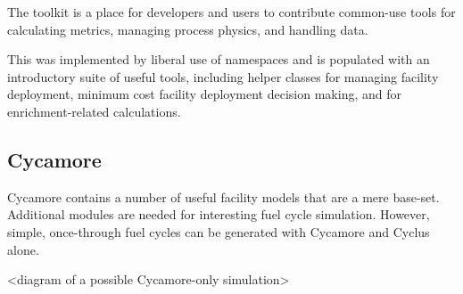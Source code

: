 The toolkit is a place for developers and users to contribute common-use tools 
for calculating metrics, managing process physics, and handling data.

This was implemented by liberal use of namespaces and is populated with an
introductory suite of useful tools, including helper classes for managing
facility deployment, minimum cost facility deployment decision making, and for
enrichment-related calculations.

\subsection{Cycamore}

Cycamore contains a number of useful facility models that are a mere base-set.
Additional modules are needed for interesting fuel cycle simulation. However,
simple, once-through fuel cycles can be generated with Cycamore and Cyclus alone.

<diagram of a possible Cycamore-only simulation>

